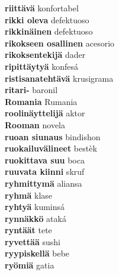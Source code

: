\textbf{ riittävä  } konfortabel \\
\textbf{ rikki oleva  } defektuoso \\
\textbf{ rikkinäinen  } defektuoso \\
\textbf{ rikokseen osallinen  } acesorio \\
\textbf{ rikoksentekijä  } dader \\
\textbf{ ripittäytyä  } konfesá \\
\textbf{ ristisanatehtävä  } krusigrama \\
\textbf{ ritari-  } baronil \\
\textbf{ Romania  } Rumania \\
\textbf{ roolinäyttelijä  } aktor \\
\textbf{ Rooman  } novela \\
\textbf{ ruoan siunaus  } bindishon \\
\textbf{ ruokailuvälineet  } bestèk \\
\textbf{ ruokittava suu  } boca \\
\textbf{ ruuvata kiinni  } skruf \\
\textbf{ ryhmittymä  } aliansa \\
\textbf{ ryhmä  } klase \\
\textbf{ ryhtyä  } kuminsá \\
\textbf{ rynnäkkö  } ataká \\
\textbf{ ryntäät  } tete \\
\textbf{ ryvettää  } sushi \\
\textbf{ ryypiskellä  } bebe \\
\textbf{ ryömiä  } gatia \\
